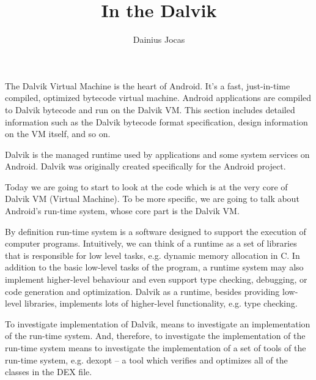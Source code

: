 \documentclass[10pt,a4paper]{article}
\author{Dainius Jocas}
\title{In the Dalvik}
\begin{document}
\maketitle

The Dalvik Virtual Machine is the heart of Android. It's a fast, just-in-time compiled, optimized bytecode virtual machine. Android applications are compiled to Dalvik bytecode and run on the Dalvik VM. This section includes detailed information such as the Dalvik bytecode format specification, design information on the VM itself, and so on.

Dalvik is the managed runtime used by applications and some system services on Android. Dalvik was originally created specifically for the Android project.

Today we are going to start to look at the code which is at the very core of Dalvik VM (Virtual Machine). To be more specific, we are going to talk about Android's run-time system, whose core part is the Dalvik VM. 

By definition run-time system is a software designed to support the execution of computer programs. Intuitively, we can think of a runtime as a set of libraries that is responsible for low level tasks, e.g. dynamic memory allocation in C. In addition to the basic low-level tasks of the program, a runtime system may also implement higher-level behaviour and even support type checking, debugging, or code generation and optimization. Dalvik as a runtime, besides providing low-level libraries, implements lots of higher-level functionality, e.g. type checking.

To investigate implementation of Dalvik, means to investigate an implementation of the run-time system. And, therefore, to investigate the implementation of the run-time system means to investigate the implementation of a set of tools of the run-time system, e.g. dexopt -- a tool which verifies and optimizes all of the classes in the DEX file.
\end{document}
